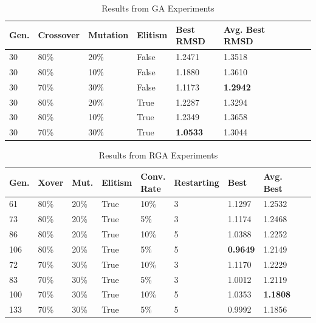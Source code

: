 \documentclass[10pt]{beamer}
\begin{document}
\begin{frame}

	\begin{table}
	  \small
	  \begin{tabular}{ | l | l | l | l | l | l | l | l | c | c | }
		\hline
		Gen. & Crossover & Mutation & Elitism & Best RMSD & Avg. Best RMSD \\ \hline \hline
		30 & 80\% & 20\% & False & 1.2471 & 1.3518 \\ \hline
		30 & 80\% & 10\% & False & 1.1880 & 1.3610 \\ \hline
		30 & 70\% & 30\% & False & 1.1173 & \textbf{1.2942} \\ \hline
		
		30 & 80\% & 20\% & True & 1.2287 & 1.3294 \\ \hline
		30 & 80\% & 10\% & True & 1.2349 & 1.3658 \\ \hline
		30 & 70\% & 30\% & True & \textbf{1.0533} & 1.3044 \\ \hline
	  \end{tabular}
	  \caption{Results from GA Experiments}
	\end{table}

	\begin{table}
	  \small
	  \begin{tabular}{ | l | l | l | l | l | l | l | l | l | l | }
		\hline
		Gen. & Xover & Mut. & Elitism & Conv. Rate & Restarting & Best & Avg. Best \\ \hline \hline
		61 & 80\% & 20\% & True & 10\% & 3 & 1.1297 & 1.2532 \\ \hline%
		73 & 80\% & 20\% & True & 5\% & 3 & 1.1174 & 1.2468 \\ \hline%
		86 & 80\% & 20\% & True & 10\% & 5 & 1.0388 & 1.2252 \\ \hline%
		106 & 80\% & 20\% & True & 5\% & 5 & \textbf{0.9649} & 1.2149 \\ \hline%

		72 & 70\% & 30\% & True & 10\% & 3 & 1.1170 & 1.2229 \\ \hline%
		83 & 70\% & 30\% & True & 5\% & 3 & 1.0012 & 1.2119 \\ \hline%
		100 & 70\% & 30\% & True & 10\% & 5 & 1.0353 & \textbf{1.1808} \\ \hline%
		133 & 70\% & 30\% & True & 5\% & 5 & 0.9992 & 1.1856 \\ \hline%
	  \end{tabular}
	  \caption{Results from RGA Experiments}
	\end{table}

\end{frame}
\end{document}
